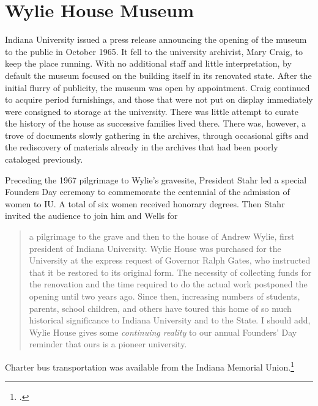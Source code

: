 \documentclass[
  american,
  letterpaper,
]{scrreprt}
\begin{document}
\section{Wylie House Museum}\label{wylie-house-museum}

Indiana University issued a press release announcing the opening of the
museum to the public in October 1965. It fell to the university
archivist, Mary Craig, to keep the place running. With no additional
staff and little interpretation, by default the museum focused on the
building itself in its renovated state. After the initial flurry of
publicity, the museum was open by appointment. Craig continued to
acquire period furnishings, and those that were not put on display
immediately were consigned to storage at the university. There was
little attempt to curate the history of the house as successive families
lived there. There was, however, a trove of documents slowly gathering
in the archives, through occasional gifts and the rediscovery of
materials already in the archives that had been poorly cataloged
previously.

Preceding the 1967 pilgrimage to Wylie's gravesite, President Stahr led
a special Founders Day ceremony to commemorate the centennial of the
admission of women to IU. A total of six women received honorary
degrees. Then Stahr invited the audience to join him and Wells for

\begin{quote}
a pilgrimage to the grave and then to the house of Andrew Wylie, first
president of Indiana University. Wylie House was purchased for the
University at the express request of Governor Ralph Gates, who
instructed that it be restored to its original form. The necessity of
collecting funds for the renovation and the time required to do the
actual work postponed the opening until two years ago. Since then,
increasing numbers of students, parents, school children, and others
have toured this home of so much historical significance to Indiana
University and to the State. I should add, Wylie House gives some
\emph{continuing reality} to our annual Founders' Day reminder that ours
is a pioneer university.
\end{quote}

Charter bus transportation was available from the Indiana Memorial
Union.\footnote{.}
\end{document}
